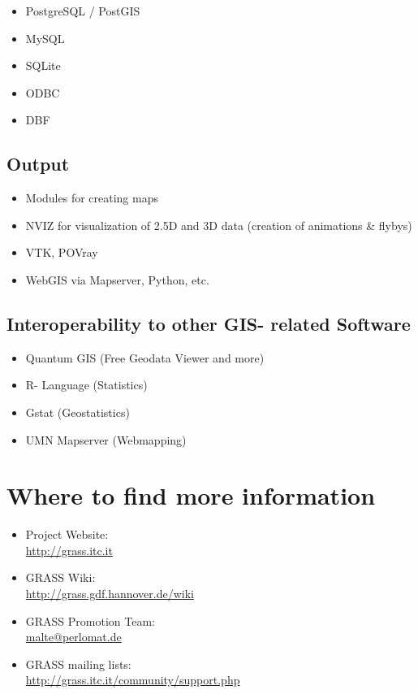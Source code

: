 \documentclass[notumble,a4paper,10pt,nofoldmark]{leaflet}
\newcommand{\GRASSurl}{\url{http://grass.itc.it}}
\begin{document}
\begin{itemize}
\item PostgreSQL / PostGIS
\item MySQL
\item SQLite
\item ODBC
\item DBF
\end{itemize}

\subsection{Output}

\begin{itemize}
\item Modules for creating maps
\item NVIZ for visualization of 2.5D and 3D data (creation of animations \& flybys)
\item VTK, POVray
\item WebGIS via Mapserver, Python, etc.
\end{itemize}

\subsection{Interoperability to other GIS- related Software}

\begin{itemize}
\item Quantum GIS (Free Geodata Viewer and more)
\item R- Language (Statistics)
\item Gstat (Geostatistics)
\item UMN Mapserver (Webmapping)
\end{itemize}

\section{Where to find more information}

\begin{itemize}
\item{Project Website: \\\GRASSurl}
\item{GRASS Wiki: \\\url{http://grass.gdf.hannover.de/wiki}}
\item{GRASS Promotion Team: \\\url{malte@perlomat.de}}
\item{GRASS mailing lists: \\\url{http://grass.itc.it/community/support.php}}
\end{itemize}
\end{document}
